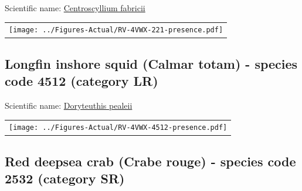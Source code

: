 \documentclass[12pt]{article}\usepackage[]{graphicx}\usepackage[]{color}
\begin{document}
  


Scientific name: \href{http://www.marinespecies.org/aphia.php?p=taxdetails\&id=105906}{Centroscyllium fabricii} \newline
\begin{minipage}{1.0\textwidth}
 \begin{tabular}{c}
\texttt{[image: ../Figures-Actual/RV-4VWX-221-presence.pdf]} \\ 
\end{tabular} 
\end{minipage}
\clearpage

\renewcommand\thefigure{\thesubsection\Alph{figure}}

\setcounter{figure}{0}

\hypertarget{sec:4512}{%
\subsection{Longfin inshore squid (Calmar totam) - species code 4512 (category LR)}\label{sec:4512}}

  


Scientific name: \href{http://www.marinespecies.org/aphia.php?p=taxdetails\&id=574541}{Doryteuthis pealeii} \newline
\begin{minipage}{1.0\textwidth}
 \begin{tabular}{c}
\texttt{[image: ../Figures-Actual/RV-4VWX-4512-presence.pdf]} \\ 
\end{tabular} 
\end{minipage}
\clearpage

\renewcommand\thefigure{\thesubsection\Alph{figure}}

\setcounter{figure}{0}

\hypertarget{sec:2532}{%
\subsection{Red deepsea crab (Crabe rouge) - species code 2532 (category SR)}\label{sec:2532}}
\end{document}
